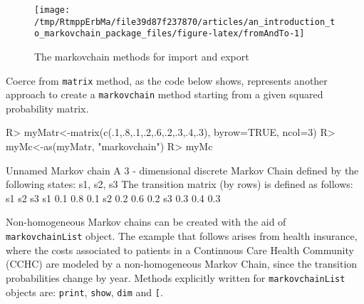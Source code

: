 \documentclass[
  nojss]{jss}
\begin{document}
\begin{CodeChunk}
\begin{figure}

{\centering \texttt{[image: /tmp/RtmppErbMa/file39d87f237870/articles/an\_introduction\_to\_markovchain\_package\_files/figure-latex/fromAndTo-1]} 

}

\caption[The markovchain methods for import and export]{The markovchain methods for import and export}\label{fig:fromAndTo}
\end{figure}
\end{CodeChunk}

Coerce from \texttt{matrix} method, as the code below shows, represents another approach to create a \texttt{markovchain} method starting from a given squared probability matrix.

\begin{CodeChunk}

\begin{CodeInput}
R> myMatr<-matrix(c(.1,.8,.1,.2,.6,.2,.3,.4,.3), byrow=TRUE, ncol=3)
R> myMc<-as(myMatr, "markovchain")
R> myMc
\end{CodeInput}

\begin{CodeOutput}
Unnamed Markov chain 
 A  3 - dimensional discrete Markov Chain defined by the following states: 
 s1, s2, s3 
 The transition matrix  (by rows)  is defined as follows: 
    s1  s2  s3
s1 0.1 0.8 0.1
s2 0.2 0.6 0.2
s3 0.3 0.4 0.3
\end{CodeOutput}
\end{CodeChunk}

Non-homogeneous Markov chains can be created with the aid of \texttt{markovchainList} object. The example that follows arises from health insurance, where the costs associated to patients in a Continuous Care Health Community (CCHC) are modeled by a non-homogeneous Markov Chain, since the transition probabilities change by year. Methods explicitly written for \texttt{markovchainList} objects are: \texttt{print}, \texttt{show}, \texttt{dim} and \texttt{{[}}.
\end{document}
